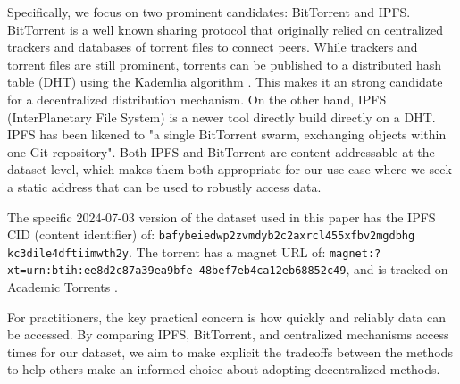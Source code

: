 \documentclass[10pt,twocolumn,letterpaper]{article}
\begin{document}
Specifically, we focus on two prominent candidates:
BitTorrent and IPFS.
BitTorrent \cite{cohen_incentives_2003, cohen_bittorrent_2017} is a well known sharing protocol that
  originally relied on centralized trackers and databases of torrent files to connect peers.
While trackers and torrent files are still prominent, torrents can be published to a distributed hash table
  (DHT) using the Kademlia algorithm \cite{maymounkov_kademlia_2002}.
This makes it an strong candidate for a decentralized distribution mechanism.
On the other hand, IPFS (InterPlanetary File System) \cite{benet_ipfs_2014, bieri_overview_2021} is a newer
  tool directly build directly on a DHT.
IPFS has been likened to "a single BitTorrent swarm, exchanging objects within one Git repository".
Both IPFS and BitTorrent are content addressable at the dataset level, which makes them both appropriate for
  our use case where we seek a static address that can be used to robustly access data.


The specific 2024-07-03 version of the dataset used in this paper has the IPFS CID (content identifier) of:
{\tt bafybeiedwp2zvmdyb2c2axrcl455xfbv2mgdbhg kc3dile4dftiimwth2y}.
The torrent has a magnet URL of:
{\tt magnet:?xt=urn:btih:ee8d2c87a39ea9bfe 48bef7eb4ca12eb68852c49}, and is 
tracked on Academic Torrents \cite{academic_torrents_Cohen2014}.

For practitioners, the key practical concern is how quickly and reliably data can be accessed.
By comparing IPFS, BitTorrent, and centralized mechanisms access times for our dataset, we aim to make
  explicit the tradeoffs between the methods to help others make an informed choice about adopting
  decentralized methods.

\end{document}
